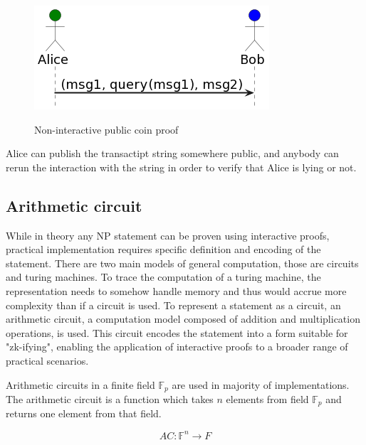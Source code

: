 \documentclass[conference,comsoc,10pt]{IEEEtran}
\begin{document}
        \begin{figure}[h]
            \centering
            \includegraphics[scale=0.7]{../bachelor/assets/images/non_interactive_coin.png}
            \caption{Non-interactive public coin proof}
            \label{fig:non_interactive_coin}
            \cite{Fiat, youtubeMOOCLecture1}
            \vspace{0.5cm}
        \end{figure}

        Alice can publish the transactipt string somewhere public, and anybody
        can rerun the interaction with the string in order to verify that Alice
        is lying or not.
        \pagebreak

    \subsection{Arithmetic circuit}

        While in theory any NP statement \cite{goldreich1991proofs} can be proven using
        interactive proofs, practical implementation requires specific definition and
        encoding of the statement. There are two main models of general computation,
        those are circuits and turing machines. To trace the computation of a turing
        machine, the representation needs to somehow handle memory and thus would accrue
        more complexity than if a circuit is used. To represent a statement as a
        circuit, an arithmetic circuit, a computation model composed of addition and
        multiplication operations, is used. This circuit encodes the statement into a
        form suitable for "zk-ifying", enabling the application of interactive proofs
        to a broader range of practical scenarios.

        Arithmetic circuits in a finite field $\mathbb{F}_p$ are used in majority
        of implementations. The arithmetic circuit is a function which takes
        $n$ elements from field $\mathbb{F}_p$ and returns one element from that field.

        \[AC: \mathbb{F}^n \rightarrow F \]
\end{document}
